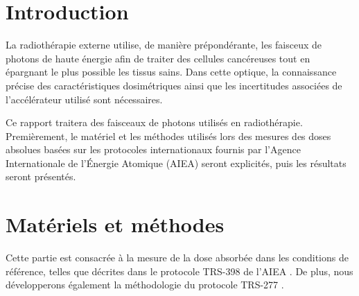 \documentclass{article}
\begin{document}




\onehalfspacing

\pagestyle{fancy}
	\renewcommand\headrulewidth{0.5pt}
	\renewcommand\footrulewidth{0.5pt}
	\fancyfoot[R]{\thepage}

\tableofcontents
\clearpage
\section{Introduction}

La radiothérapie externe utilise, de manière prépondérante, les faisceux de photons de haute énergie afin de traiter des cellules cancéreuses tout en épargnant le plus possible les tissus sains. Dans cette optique, la connaissance précise des caractéristiques dosimétriques ainsi que les incertitudes associées de l'accélérateur utilisé sont nécessaires. 

Ce rapport traitera des faisceaux de photons utilisés en radiothérapie. Premièrement, le matériel et les méthodes utilisés lors des mesures des doses absolues basées sur les protocoles internationaux fournis par l'Agence Internationale de l'Énergie Atomique (AIEA) seront explicités, puis les résultats seront présentés. 

\section{Matériels et méthodes}

Cette partie est consacrée à la mesure de la dose absorbée dans les conditions de référence, telles que décrites dans le protocole TRS-398 de l'AIEA \cite{international2001iaea}. De plus, nous développerons également la méthodologie du protocole TRS-277 \cite{internationaliaea}.
\end{document}
